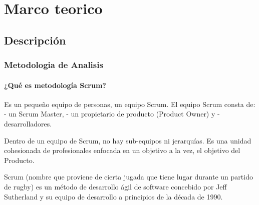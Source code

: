\documentclass[spanish,12pt]{article}
\begin{document}
\section{Marco teorico}\label{marco-teorico}

\subsection{Descripción}\label{descripciuxf3n}

\subsubsection{Metodologia de Analisis}\label{metodologia-de-analisis}

\paragraph{¿Qué es metodología
Scrum?}\label{quuxe9-es-metodologuxeda-scrum}

Es un pequeño equipo de personas, un equipo Scrum. El equipo Scrum
consta de: - un Scrum Master, - un propietario de producto (Product
Owner) y - desarrolladores.

Dentro de un equipo de Scrum, no hay sub-equipos ni jerarquías. Es una
unidad cohesionada de profesionales enfocada en un objetivo a la vez, el
objetivo del Producto.

Scrum (nombre que proviene de cierta jugada que tiene lugar durante un
partido de rugby) es un método de desarrollo ágil de software concebido
por Jeff Sutherland y su equipo de desarrollo a principios de la década
de 1990.
\end{document}
